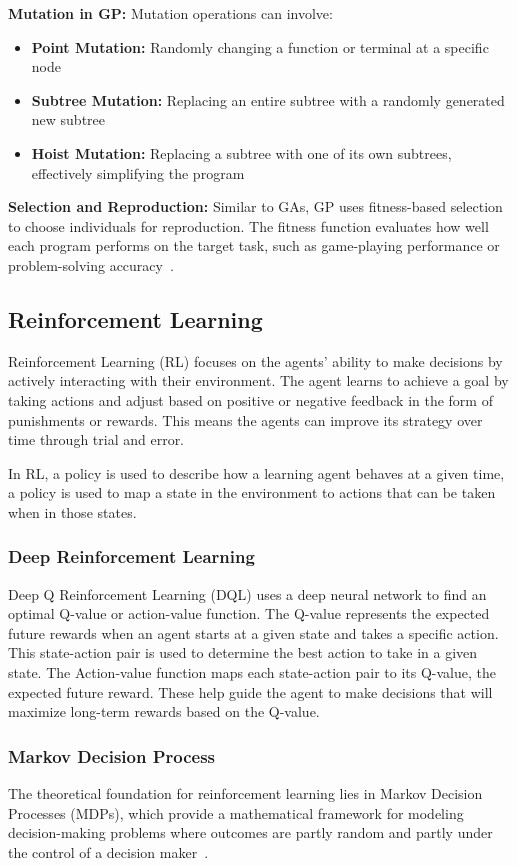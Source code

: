 \documentclass[a4paper,12pt]{article}
\begin{document}
\textbf{Mutation in GP:} Mutation operations can involve:
\begin{itemize}
   \item \textbf{Point Mutation:} Randomly changing a function or terminal at a specific node
   \item \textbf{Subtree Mutation:} Replacing an entire subtree with a randomly generated new subtree
   \item \textbf{Hoist Mutation:} Replacing a subtree with one of its own subtrees, effectively simplifying the program
\end{itemize}

\textbf{Selection and Reproduction:} Similar to GAs, GP uses fitness-based selection to choose individuals for reproduction. 
The fitness function evaluates how well each program performs on the target task, such as game-playing performance or problem-solving accuracy~\cite{GPP}.

\subsection{Reinforcement Learning}
Reinforcement Learning (RL) focuses on the agents' ability to make decisions by actively interacting with their environment.
The agent learns to achieve a goal by taking actions and adjust based on positive or negative feedback in the form of punishments or rewards.
This means the agents can improve its strategy over time through trial and error. \cite{DRL}

In RL, a policy is used to describe how a learning agent behaves at a given time, a policy is used 
to map a state in the environment to actions that can be taken when in those states. \cite{ReinforcementIntro}

\subsubsection{Deep Reinforcement Learning}
Deep Q Reinforcement Learning (DQL) \cite{DQL} uses a deep neural network to find an optimal Q-value or action-value function.
The Q-value represents the expected future rewards when an agent starts at a given state and takes a specific action.
This state-action pair is used to determine the best action to take in a given state.
The Action-value function maps each state-action pair to its Q-value, the expected future reward. These help
guide the agent to make decisions that will maximize long-term rewards based on the Q-value.

\subsubsection{Markov Decision Process}
The theoretical foundation for reinforcement learning lies in Markov Decision Processes (MDPs), which provide a mathematical framework for modeling decision-making problems where outcomes are partly random and partly under the control of a decision maker~\cite{markov}.
\end{document}
